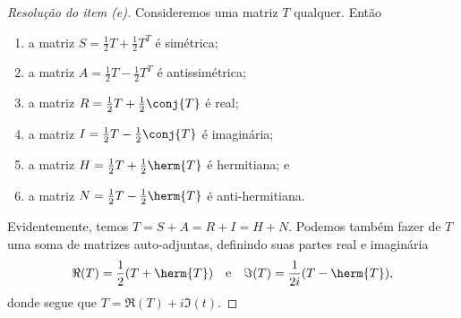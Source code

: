 \begin{proof}[Resolução do item (e)]
    Consideremos uma matriz \(T\) qualquer. Então
    \begin{enumerate}[label=(\roman*)]
        \item a matriz \(S = \frac12 T + \frac12T^T\) é simétrica;
        \item a matriz \(A = \frac12T - \frac12T^T\) é antissimétrica;
        \item a matriz \(R = \frac12 T + \frac12 \conj{T}\) é real;
        \item a matriz \(I = \frac12 T - \frac12 \conj{T}\) é imaginária;
        \item a matriz \(H = \frac12T + \frac12\herm{T}\) é hermitiana; e
        \item a matriz \(N = \frac12T - \frac12\herm{T}\) é anti-hermitiana.
    \end{enumerate}
    Evidentemente, temos \(T = S + A = R + I = H + N\). Podemos também fazer de \(T\) uma soma de matrizes auto-adjuntas, definindo suas partes real e imaginária
    \begin{equation*}
        \Re(T) = \frac12(T + \herm{T})
        \quad\text{e}\quad
        \Im(T) = \frac{1}{2i}(T - \herm{T}),
    \end{equation*}
    donde segue que \(T = \Re(T) + i \Im(t)\).
\end{proof}
